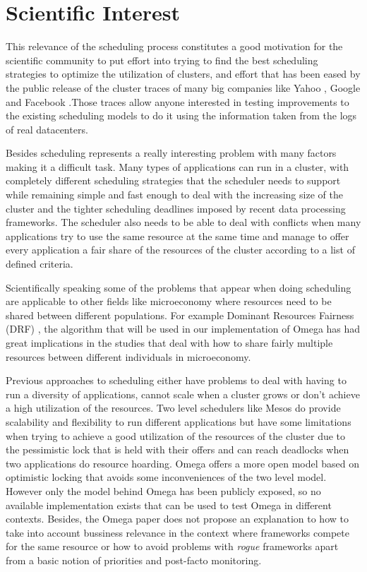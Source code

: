 \documentclass{report}                     %
\begin{document}
\section{Scientific Interest}

This relevance of the scheduling process constitutes a good motivation
for the scientific community to put effort into trying to find the
best scheduling strategies to optimize the utilization of clusters,
and effort that has been eased by the public release of the cluster
traces of many big companies like Yahoo \cite{parashar_10th_2010},
Google \cite{mishra_towards_2010} and Facebook
\cite{Chen:EECS-2012-17} .Those traces allow anyone interested in
testing improvements to the existing scheduling models to do it using
the information taken from the logs of real datacenters.

Besides scheduling represents a really interesting problem with many
factors making it a difficult task. Many types of applications can run
in a cluster, with completely different scheduling strategies that the
scheduler needs to support while remaining simple and fast enough to
deal with the increasing size of the cluster and the tighter
scheduling deadlines imposed by recent data processing frameworks.
The scheduler also needs to be able to deal with conflicts when many
applications try to use the same resource at the same time and manage
to offer every application a fair share of the resources of the
cluster according to a list of defined criteria. 

Scientifically speaking some of the problems that appear when doing
scheduling are applicable to other fields like microeconomy where
resources need to be shared between different populations. For example
Dominant Resources Fairness (DRF) \cite{ghodsi2011dominant} , the
algorithm that will be used in our implementation of Omega has had
great implications in the studies that deal with how to share fairly
multiple resources between different individuals in microeconomy.

Previous approaches to scheduling either have problems to deal with
having to run a diversity of applications, cannot scale when a cluster
grows or don't achieve a high utilization of the resources. Two level
schedulers like Mesos \cite{Hindman10mesos:a} do provide scalability
and flexibility to run different applications but have some
limitations when trying to achieve a good utilization of the resources
of the cluster due to the pessimistic lock that is held with their
offers and can reach deadlocks when two applications do resource
hoarding. Omega \cite{41684} offers a more open model based on
optimistic locking that avoids some inconveniences of the two level
model. However only the model behind Omega has been publicly exposed,
so no available implementation exists that can be used to test Omega
in different contexts. Besides, the Omega paper does not propose an
explanation to how to take into account bussiness relevance in the
context where frameworks compete for the same resource or how to avoid
problems with \emph{rogue} frameworks apart from a basic notion of
priorities and post-facto monitoring.
\end{document}
